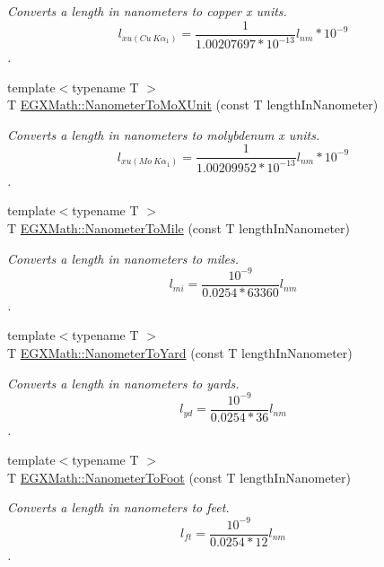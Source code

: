 \begin{DoxyCompactItemize}
\begin{DoxyCompactList}\small\item\em Converts a length in nanometers to copper x units. \[ l_{xu(Cu\ K\alpha_1)}= \frac{1}{1.00207697*10^{-13}} l_{nm} * 10^{-9}\]. \end{DoxyCompactList}\item 
{\footnotesize template$<$typename T $>$ }\\T \mbox{\hyperlink{group___e_g_x_math-_conversions-_length_conversions-_s_i-_nanometer-_non-_s_i_gacc6d7fa95c35687718c816df3c95c7b5}{E\+G\+X\+Math\+::\+Nanometer\+To\+Mo\+X\+Unit}} (const T length\+In\+Nanometer)
\begin{DoxyCompactList}\small\item\em Converts a length in nanometers to molybdenum x units. \[ l_{xu(Mo\ K\alpha_1)}=\frac{1}{1.00209952*10^{-13}} l_{nm} * 10^{-9}\]. \end{DoxyCompactList}\item 
{\footnotesize template$<$typename T $>$ }\\T \mbox{\hyperlink{group___e_g_x_math-_conversions-_length_conversions-_s_i-_nanometer-_imperial_gadbf1e269e14b8afcd128aa5534f28a5e}{E\+G\+X\+Math\+::\+Nanometer\+To\+Mile}} (const T length\+In\+Nanometer)
\begin{DoxyCompactList}\small\item\em Converts a length in nanometers to miles. \[ l_{mi}=\frac{10^{-9}}{0.0254 * 63360} l_{nm} \]. \end{DoxyCompactList}\item 
{\footnotesize template$<$typename T $>$ }\\T \mbox{\hyperlink{group___e_g_x_math-_conversions-_length_conversions-_s_i-_nanometer-_imperial_ga1f2313a0bf1527690778a6dace0db853}{E\+G\+X\+Math\+::\+Nanometer\+To\+Yard}} (const T length\+In\+Nanometer)
\begin{DoxyCompactList}\small\item\em Converts a length in nanometers to yards. \[ l_{yd}= \frac{10^{-9}}{0.0254 * 36} l_{nm} \]. \end{DoxyCompactList}\item 
{\footnotesize template$<$typename T $>$ }\\T \mbox{\hyperlink{group___e_g_x_math-_conversions-_length_conversions-_s_i-_nanometer-_imperial_ga7c6124e07aa11d37695c96c5a520197d}{E\+G\+X\+Math\+::\+Nanometer\+To\+Foot}} (const T length\+In\+Nanometer)
\begin{DoxyCompactList}\small\item\em Converts a length in nanometers to feet. \[ l_{ft}= \frac{10^{-9}}{0.0254 * 12} l_{nm} \]. \end{DoxyCompactList}\item 

\end{DoxyCompactItemize}

